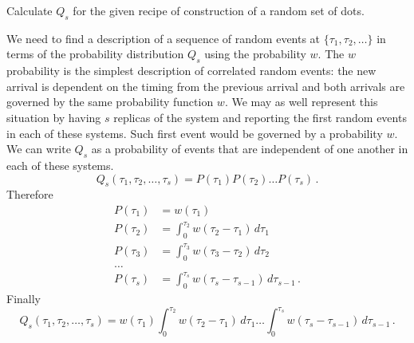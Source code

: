 

Calculate $Q_s$ for the given recipe of construction of a random set of dots.


We need to find a description of a sequence of random events at $\{\tau_1, \tau_2, \ldots \}$ in terms of the probability distribution $Q_s$ using the probability $w$.
The $w$ probability is the simplest description of correlated random events: the new arrival is dependent on the timing from the previous arrival and both arrivals are governed by the same probability function $w$.
We may as well represent this situation by having $s$ replicas of the system and reporting the first random events in each of these systems.
Such first event would be governed by a probability $w$.
We can write $Q_s$ as a probability of events that are independent of one another in each of these systems.
\begin{equation}
  Q_s(\tau_1, \tau_2, \ldots, \tau_s) = P(\tau_1) P(\tau_2) \ldots P(\tau_s)
  \, .
\end{equation}
Therefore
\begin{align*}
  P(\tau_1) &= w(\tau_1) \\
  P(\tau_2) &= \int_{0}^{\tau_2} w(\tau_2-\tau_1) \, d\tau_1\\
  P(\tau_3) &= \int_{0}^{\tau_3} w(\tau_3-\tau_2) \, d\tau_2\\
  \ldots \\
  P(\tau_s) &= \int_0^{\tau_s} w(\tau_s-\tau_{s-1}) \, d\tau_{s-1}
  \, .
\end{align*}
Finally
\begin{equation}
  Q_s(\tau_1, \tau_2, \ldots, \tau_s)
  =w(\tau_1) \int_0^{\tau_2} w(\tau_2-\tau_1) \, d\tau_1 \ldots \int_0^{\tau_s} w(\tau_s-\tau_{s-1}) \, d\tau_{s-1}
  \, .
\end{equation}
